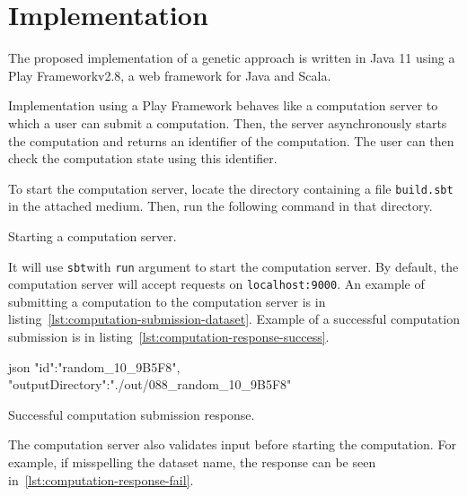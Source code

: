 \newpage


\section{Implementation}\label{sec:implementation}

The proposed implementation of a genetic approach is written in Java 11
using a Play Framework\footnotemark[1] v2.8, a web framework for Java and Scala.

Implementation using a Play Framework behaves like a computation server to which
a user can submit a computation.
Then, the server asynchronously starts the computation and returns an identifier of the computation.
The user can then check the computation state using this identifier.

To start the computation server, locate the directory containing a file \verb|build.sbt| in the attached medium.
Then, run the following command in that directory.

\begin{listing}[h!]
    \caption[Starting a computation server]
    {Starting a computation server.}
    \label{lst:sbt-run}
\end{listing}

It will use \verb|sbt|\footnotemark[3] with \verb|run| argument to start the computation server.
By default, the computation server will accept requests on \verb|localhost:9000|.
An example of submitting a computation to the computation server is in listing~\ref{lst:computation-submission-dataset}.
Example of a successful computation submission is in listing~\ref{lst:computation-response-success}.

\begin{listing}[h!]
    \begin{cminted}[autogobble,breaklines=true]{json}
    {
        "id":"random_10_9B5F8",
        "outputDirectory":"./out/088_random_10_9B5F8"
    }
    \end{cminted}
    \caption[Successful computation submission response]
    {Successful computation submission response.}
    \label{lst:computation-response-success}
\end{listing}

The computation server also validates input before starting the computation.
For example, if misspelling the dataset name, the response can be seen in~\ref{lst:computation-response-fail}.

